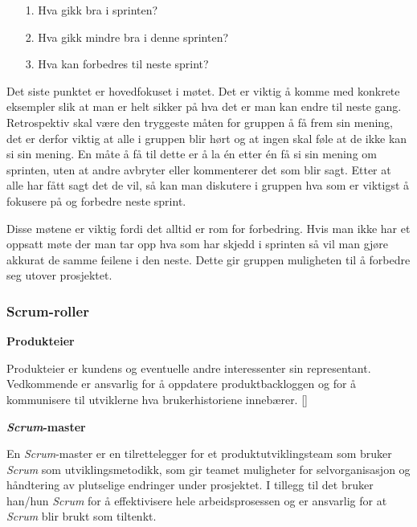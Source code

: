 \documentclass[12pt,a4paper,norsk]{article}
\begin{document}
  \begin{itemize}
        \item[1.] Hva gikk bra i sprinten?
        \item[2.] Hva gikk mindre bra i denne sprinten?
        \item[3.] Hva kan forbedres til neste sprint?
    \end{itemize}

    Det siste punktet er hovedfokuset i møtet. Det er viktig å komme med konkrete eksempler slik at man er helt sikker på hva det er man kan endre til neste gang. Retrospektiv skal være den tryggeste måten for gruppen å få frem sin mening, det er derfor viktig at alle i gruppen blir hørt og at ingen skal føle at de ikke kan si sin mening. En måte å få til dette er å la én etter én få si sin mening om sprinten, uten at andre avbryter eller kommenterer det som blir sagt. Etter at alle har fått sagt det de vil, så kan man diskutere i gruppen hva som er viktigst å fokusere på og forbedre neste sprint.

    Disse møtene er viktig fordi det alltid er rom for forbedring. Hvis man ikke har et oppsatt møte der man tar opp hva som har skjedd i sprinten så vil man gjøre akkurat de samme feilene i den neste. Dette gir gruppen muligheten til å forbedre seg utover prosjektet.
    \cite[side 82 - 88]{kniberg}
  \subsubsection{Scrum-roller}\label{subsec:scrumroller}
  \textbf {Produkteier}
    \par Produkteier er kundens og eventuelle andre interessenter sin representant. Vedkommende er ansvarlig for å oppdatere  produktbackloggen og for å kommunisere til utviklerne hva brukerhistoriene innebærer.
    [\cite{scrumguides}]

    \bigskip \noindent \textbf{\textit{Scrum}-master}
    \par En \textit{Scrum}-master er en tilrettelegger for et produktutviklingsteam som bruker \textit{Scrum} som utviklingsmetodikk, som gir teamet muligheter for selvorganisasjon og håndtering av plutselige endringer under prosjektet. I tillegg til det bruker han/hun \textit{Scrum} for å effektivisere hele arbeidsprosessen og er ansvarlig for at \textit{Scrum} blir brukt som tiltenkt.
\end{document}
